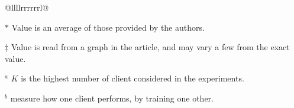 \begin{threeparttable}
\begin{2xtabular}{@{}llllrrrrrrl@{}}
    \end{2xtabular}

    \begin{tablenotes}
        \item \(\ast\) Value is an average of those provided by the authors.
        \item \(\ddagger\) Value is read from a graph in the article, and may vary a few
        from the exact value.\vspace{2ex}
        \item \(^a\) \(K\) is the highest number of client considered in the experiments.
        \item \(^b\) \textcite{chen_Networkanomalydetection_2020} measure how one client performs, by training one other.
    \end{tablenotes}
    
\end{threeparttable}

    